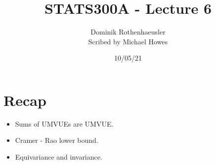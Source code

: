 




\title{STATS300A - Lecture 6}
\author{Dominik Rothenhaeusler\\ Scribed by Michael Howes}
\date{10/05/21}

\pagestyle{fancy}
\fancyhf{}


\maketitle
\tableofcontents
\section{Recap}
\begin{itemize}
    \item Sums of UMVUEs are UMVUE.
    \item Cramer - Rao lower bound.
    \item Equivariance and invariance.
\end{itemize}
